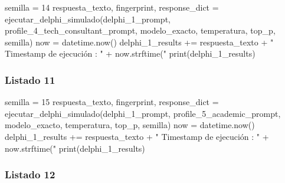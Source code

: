 \begin{APACode}
semilla = 14
respuesta_texto, fingerprint, response_dict = ejecutar_delphi_simulado(delphi_1_prompt, profile_4_tech_consultant_prompt, modelo_exacto, temperatura, top_p, semilla)
now = datetime.now()
delphi_1_results += respuesta_texto + " \n Timestamp de ejecución : " + now.strftime("%
print(delphi_1_results)
\end{APACode}

\subsubsection{Listado 11}
\label{anexo:code-6-3-1-1-11}

\begin{APACode}
semilla = 15
respuesta_texto, fingerprint, response_dict = ejecutar_delphi_simulado(delphi_1_prompt, profile_5_academic_prompt, modelo_exacto, temperatura, top_p, semilla)
now = datetime.now()
delphi_1_results += respuesta_texto + " \n Timestamp de ejecución : " + now.strftime("%
print(delphi_1_results)
\end{APACode}

\subsubsection{Listado 12}
\label{anexo:code-6-3-1-1-12}

